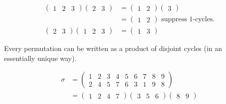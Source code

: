 \begin{example}
\begin{align*}
    \begin{pmatrix}1 & 2 & 3\end{pmatrix} \begin{pmatrix}2 & 3\end{pmatrix} &= \begin{pmatrix}1 & 2\end{pmatrix} \begin{pmatrix} 3 \end{pmatrix} \\
    &= \begin{pmatrix}1 & 2\end{pmatrix} \text{ suppress 1-cycles.} \\
    \begin{pmatrix}2 & 3\end{pmatrix} \begin{pmatrix}1 & 2 & 3\end{pmatrix} &= \begin{pmatrix}1 & 3\end{pmatrix} 
\end{align*}
\end{example}

\begin{theorem}
\protect\hypertarget{thm:one}{}\label{thm:one}Every permutation can be written as a product of disjoint cycles (in an essentially unique way).
\end{theorem}

\begin{example}
\begin{align*}
    \sigma &= \begin{pmatrix}
    1 & 2 & 3 & 4 & 5 & 6 & 7 & 8 & 9 \\
    2 & 4 & 5 & 7 & 6 & 3 & 1 & 9 & 8
    \end{pmatrix} \\
    &= \begin{pmatrix} 1 & 2 & 4 & 7 \end{pmatrix} \begin{pmatrix}3 & 5 & 6\end{pmatrix} \begin{pmatrix}8 & 9\end{pmatrix}
\end{align*}
\end{example}

